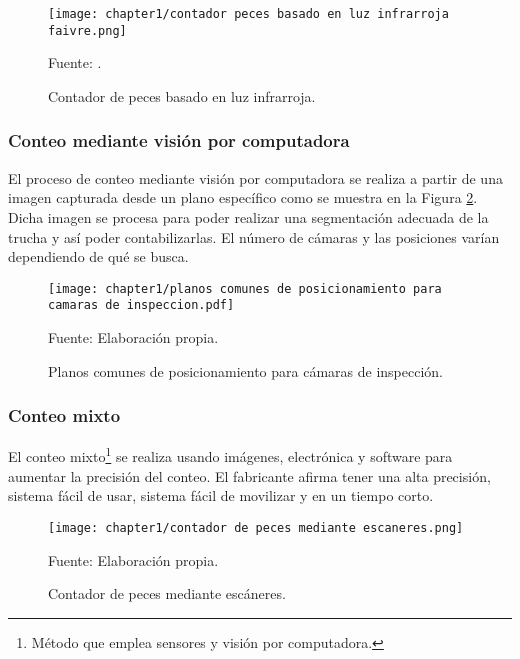 \begin{figure}[H]
	\centering
	\texttt{[image: chapter1/contador peces basado en luz infrarroja faivre.png]}
	\caption{Contador de peces basado en luz infrarroja.}
	\begin{myflushleftportland}
		Fuente: \citep{FAIVRE2013}.
	\end{myflushleftportland}
	\label{fig:contador peces basado en luz infrarroja faivre}
\end{figure}

\subsubsection{Conteo mediante visión por computadora}

El proceso de conteo mediante visión por computadora se realiza a partir de una imagen capturada desde un plano específico como se muestra en la  Figura \ref{fig:planos comunes de posicionamiento para camaras de inspeccion}. Dicha imagen se procesa para poder realizar una segmentación adecuada de la trucha y así poder contabilizarlas. El número de cámaras y las posiciones varían dependiendo de qué se busca.

\begin{figure}[H]
	\centering
	\texttt{[image: chapter1/planos comunes de posicionamiento para camaras de inspeccion.pdf]}
	\caption{Planos comunes de posicionamiento para cámaras de inspección.}
	\begin{myflushleftportland}
		Fuente: Elaboración propia.
	\end{myflushleftportland}
	\label{fig:planos comunes de posicionamiento para camaras de inspeccion}
\end{figure}

\subsubsection{Conteo mixto}

El conteo mixto\footnote{Método que emplea sensores y visión por computadora.} se realiza usando imágenes, electrónica y software para aumentar la precisión del conteo. El fabricante afirma tener una alta precisión, sistema fácil de usar, sistema fácil de movilizar y en un tiempo corto. \citep{AquaScan2015}

\begin{figure}[H]
	\centering
	\texttt{[image: chapter1/contador de peces mediante escaneres.png]}
	\caption{Contador de peces mediante escáneres.}
	\begin{myflushleftportland}
		Fuente: Elaboración propia.
	\end{myflushleftportland}
	\label{fig:contador de peces mediante escaneres}
\end{figure}


